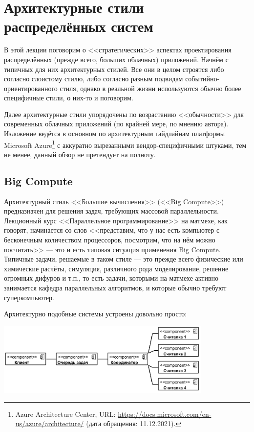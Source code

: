 \documentclass{../text-style}
\author{Юрий Литвинов\\\small{y.litvinov@spbu.ru}}
\begin{document}
\maketitle
\thispagestyle{empty}

\section{Архитектурные стили распределённых систем}

В этой лекции поговорим о <<стратегических>> аспектах проектирования распределённых (прежде всего, больших облачных) приложений. Начнём с типичных для них архитектурных стилей. Все они в целом строятся либо согласно слоистому стилю, либо согласно разным подвидам событийно-ориентированного стиля, однако в реальной жизни используются обычно более специфичные стили, о них-то и поговорим.

Далее архитектурные стили упорядочены по возрастанию <<обычности>> для современных облачных приложений (по крайней мере, по мнению автора). Изложение ведётся в основном по архитектурным гайдлайнам платформы Microsoft Azure\footnote{Azure Architecture Center, URL: \url{https://docs.microsoft.com/en-us/azure/architecture/} (дата обращения: 11.12.2021).} с аккуратно вырезанными вендор-специфичными штуками, тем не менее, данный обзор не претендует на полноту.

\subsection{Big Compute}

Архитектурный стиль <<Большие вычисления>> (<<Big Compute>>) предназначен для решения задач, требующих массовой параллельности. Лекционный курс <<Параллельное программирование>> на матмехе, как говорят, начинается со слов <<представим, что у нас есть компьютер с бесконечным количеством процессоров, посмотрим, что на нём можно посчитать>> --- это и есть типовая ситуация применения Big Compute. Типичные задачи, решаемые в таком стиле --- это прежде всего физические или химические расчёты, симуляция, различного рода моделирование, решение огромных дифуров и т.п., то есть задачи, которыми на матмехе активно занимается кафедра параллельных алгоритмов, и которые обычно требуют суперкомпьютер. 

Архитектурно подобные системы устроены довольно просто:

\begin{center}
    \includegraphics[width=0.8\textwidth]{bigCompute.png}
\end{center}
\end{document}
